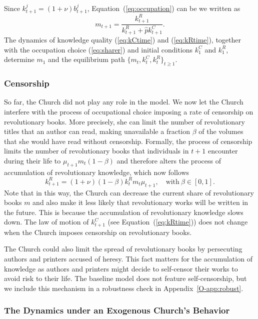 Since $k^j_{t+1}=(1+\nu)b^j_{t+1}$, Equation~(\ref{eq:occupation}) can be we written as
\begin{equation}\label{eq:sharer}
m_{t+1}=\frac{k^R_{t+1}}{k^R_{t+1}+\hat{p}k^C_{t+1}}.
\end{equation}
The dynamics of knowledge quality (\ref{eq:kCtime}) and (\ref{eq:kRtime}),  together with the occupation choice (\ref{eq:sharer})
and initial conditions $k_{1}^C$ and $k_{1}^R$, determine $m_{1}$ and the equilibrium path $\{ m_t,  k_{t}^C,  k_{t}^R\}_{t\geq 1}$.


\subsubsection*{Censorship}\label{subsection:censor}

So far, the Church did not play any role in the model. We now let  the Church interfere with the process of occupational choice imposing a rate of censorship on revolutionary books. More precisely, she can limit the number of revolutionary titles that an author can read, making unavailable a fraction $\beta$ of the volumes that she would have read without censorship. Formally, the process of censorship limits the number of revolutionary books that individuals in $t+1$ encounter during their life to $\mu_{t+1} m_t (1-\beta)$ and therefore alters the process of accumulation of revolutionary knowledge, which now follows
\begin{equation}\label{eq:censorhip}
k_{t+1}^R=(1+\nu)(1-\beta)k_{t}^R m_{t} \mu_{t+1}, \quad\text{with} \ \beta\in[0,1].
\end{equation}
Note that in this way, the Church can decrease the current share of revolutionary books $m$ and %
also make it less likely that revolutionary works will be written in the future. This is because the accumulation of revolutionary knowledge slows down. The law of motion of $k_{t+1}^C$ (see Equation~(\ref{eq:kRtime})) does not change when the Church imposes censorship on revolutionary books.


The Church could also limit the spread of revolutionary books by persecuting authors and printers accused of heresy. This fact matters for the accumulation of knowledge as authors and printers might decide to self-censor their works to avoid risk to their life. The baseline model does not feature self-censorship, but we include this mechanism in a robustness check in Appendix~\ref{O-app:robust}.



\subsubsection*{The Dynamics under an Exogenous Church's Behavior}\label{sec:exo}

